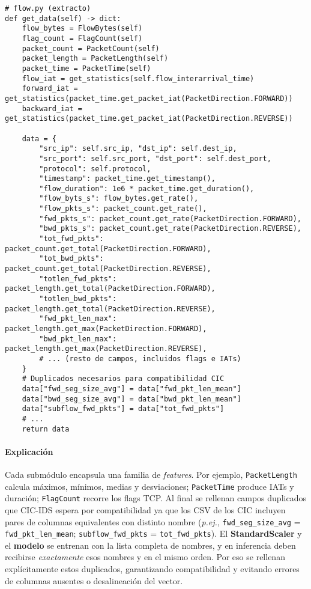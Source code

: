 \begin{lstlisting}[style=tfgpython,caption={Cálculo de features a nivel de flujo (extracto)},label=List.FlowGetData]
# flow.py (extracto)
def get_data(self) -> dict:
    flow_bytes = FlowBytes(self)
    flag_count = FlagCount(self)
    packet_count = PacketCount(self)
    packet_length = PacketLength(self)
    packet_time = PacketTime(self)
    flow_iat = get_statistics(self.flow_interarrival_time)
    forward_iat = get_statistics(packet_time.get_packet_iat(PacketDirection.FORWARD))
    backward_iat = get_statistics(packet_time.get_packet_iat(PacketDirection.REVERSE))

    data = {
        "src_ip": self.src_ip, "dst_ip": self.dest_ip,
        "src_port": self.src_port, "dst_port": self.dest_port,
        "protocol": self.protocol,
        "timestamp": packet_time.get_timestamp(),
        "flow_duration": 1e6 * packet_time.get_duration(),
        "flow_byts_s": flow_bytes.get_rate(),
        "flow_pkts_s": packet_count.get_rate(),
        "fwd_pkts_s": packet_count.get_rate(PacketDirection.FORWARD),
        "bwd_pkts_s": packet_count.get_rate(PacketDirection.REVERSE),
        "tot_fwd_pkts": packet_count.get_total(PacketDirection.FORWARD),
        "tot_bwd_pkts": packet_count.get_total(PacketDirection.REVERSE),
        "totlen_fwd_pkts": packet_length.get_total(PacketDirection.FORWARD),
        "totlen_bwd_pkts": packet_length.get_total(PacketDirection.REVERSE),
        "fwd_pkt_len_max": packet_length.get_max(PacketDirection.FORWARD),
        "bwd_pkt_len_max": packet_length.get_max(PacketDirection.REVERSE),
        # ... (resto de campos, incluidos flags e IATs)
    }
    # Duplicados necesarios para compatibilidad CIC
    data["fwd_seg_size_avg"] = data["fwd_pkt_len_mean"]
    data["bwd_seg_size_avg"] = data["bwd_pkt_len_mean"]
    data["subflow_fwd_pkts"] = data["tot_fwd_pkts"]
    # ...
    return data
\end{lstlisting}

\paragraph{Explicación}
Cada submódulo encapsula una familia de \emph{features}. Por ejemplo, \texttt{PacketLength} calcula máximos, mínimos, medias y desviaciones; \texttt{PacketTime} produce IATs y duración; \texttt{FlagCount} recorre los flags TCP. Al final se rellenan campos duplicados que CIC-IDS espera por compatibilidad ya que los CSV de los CIC incluyen pares de columnas equivalentes con distinto nombre (\emph{p.ej.}, \texttt{fwd\_seg\_size\_avg} = \texttt{fwd\_pkt\_len\_mean}; \texttt{subflow\_fwd\_pkts} = \texttt{tot\_fwd\_pkts}). El \textbf{StandardScaler} y el \textbf{modelo} se entrenan con la lista completa de nombres, y en inferencia deben recibirse \emph{exactamente} esos nombres y en el mismo orden. Por eso se rellenan explícitamente estos duplicados, garantizando compatibilidad y evitando errores de columnas ausentes o desalineación del vector.

